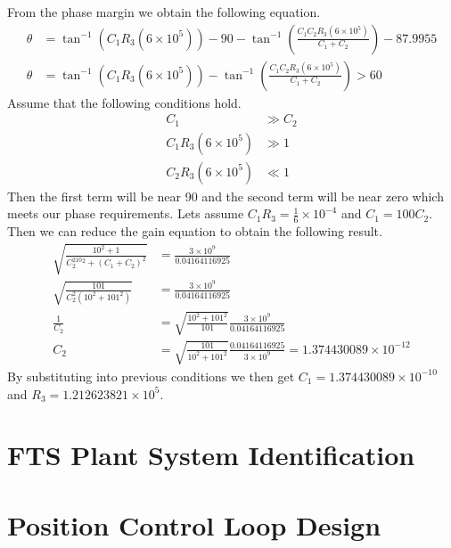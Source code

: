 \documentclass[12pt]{article}
\begin{document}
From the phase margin we obtain the following equation.
\begin{align*}
    \theta &= \tan^{-1}(C_1R_3(6\times 10^5))-90-\tan^{-1}\left(\frac{C_1C_2R_3(6\times 10^5)}{C_1+C_2}\right)-87.9955\\
    \theta &= \tan^{-1}(C_1R_3(6\times 10^5))-\tan^{-1}\left(\frac{C_1C_2R_3(6\times 10^5)}{C_1+C_2}\right) > 60
\end{align*}
Assume that the following conditions hold.
\begin{align*}
    C_1 &\gg C_2\\
    C_1R_3(6\times 10^5) &\gg 1\\
    C_2R_3(6\times 10^5) &\ll 1
\end{align*}
Then the first term will be near 90 and the second term will be near zero which meets our phase requirements.
Lets assume \(C_1R_3 = \frac{1}{6} \times 10^{-4}\) and \(C_1 = 100C_2\). Then we can reduce the gain
equation to obtain the following result.
\begin{align*}
    \sqrt{\frac{10^2 + 1}{C_2^210^2 + (C_1 + C_2)^2}}&=\frac{3\times10^9}{0.04164116925}\\
    \sqrt{\frac{101}{C_2^2(10^2+101^2)}}&=\frac{3\times10^9}{0.04164116925}\\
    \frac{1}{C_2}&=\sqrt{\frac{10^2+101^2}{101}}\frac{3\times10^9}{0.04164116925}\\
    C_2&=\sqrt{\frac{101}{10^2+101^2}}\frac{0.04164116925}{3\times10^9}=1.374430089\times 10^{-12}
\end{align*}
By substituting into previous conditions we then get \(C_1=1.374430089\times 10^{-10}\) and \(R_3=1.212623821\times10^5\).

\section{FTS Plant System Identification}

\section{Position Control Loop Design}
\end{document}
